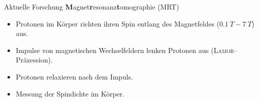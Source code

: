 \documentclass[t,9pt]{beamer}
\begin{document}

        \begin{frame}{Aktuelle Forschung}
                \textbf{M}agnet\textbf{r}esonanz\textbf{t}omographie (MRT)
                \begin{itemize}
                        \item Protonen im Körper richten ihren Spin entlang des Magnetfeldes ($\SI{0.1}{T}-\SI{7}{T}$) aus.
                        \item Impulse von magnetischen Wechselfeldern lenken Protonen aus (\textsc{Lamor}--Präzession).
                        \item Protonen relaxieren nach dem Impuls.
                        \item Messung der Spindichte im Körper.
                \end{itemize}
                \hfill\tiny\cite{Mustafa2023}\normalsize
        \end{frame}
\end{document}
